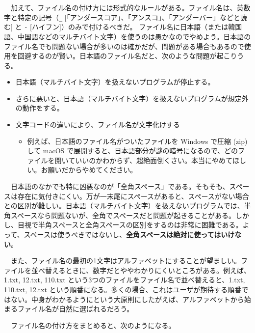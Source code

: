 \documentclass[
  a4paper,
  pandoc,
  ja=standard,
  jafont=haranoaji]{bxjsbook}
\providecommand{\tightlist}{%
  \setlength{\itemsep}{0pt}\setlength{\parskip}{0pt}}
\begin{document}
　加えて、ファイル名の付け方には形式的なルールがある。ファイル名は、英数字と特定の記号（\texttt{\_}
{[}「アンダースコア」、「アンスコ」、「アンダーバー」などと読む{]} と
\texttt{-} {[}ハイフン{]}）のみで付けるべきだ。
ファイル名に日本語（または韓国語、中国語などのマルチバイト文字）を使うのは愚かなのでやめよう。日本語のファイル名でも問題ない場合が多いのは確かだが、問題がある場合もあるので使用を回避するのが賢い。日本語のファイル名だと、次のような問題が起こりうる。

\begin{itemize}
\tightlist
\item
  日本語（マルチバイト文字）を扱えないプログラムが停止する。
\item
  さらに悪いと、日本語（マルチバイト文字）を扱えないプログラムが想定外の動作をする。
\item
  文字コードの違いにより、ファイル名が文字化けする

  \begin{itemize}
  \tightlist
  \item
    例えば、日本語のファイル名がついたファイルを Windows で圧縮 (zip)
    して macOS
    で展開すると、日本語部分が謎の暗号になるので、どのファイルを開いていいのかわからず、超絶面倒くさい。本当にやめてほしい。お願いだからやめてください。
  \end{itemize}
\end{itemize}

　日本語のなかでも特に凶悪なのが「全角スペース」である。そもそも、スペースは存在に気付きにくい。万が一末尾にスペースがあると、スペースがない場合との区別が難しい。日本語（マルチバイト文字）を扱えないプログラムでは、半角スペースなら問題ないが、全角でスペースだと問題が起きることがある。しかし、目視で半角スペースと全角スペースの区別をするのは非常に困難である。よって、スペースは使うべきではないし、\textbf{全角スペースは絶対に使ってはいけない}。

　また、ファイル名の最初の1文字はアルファベットにすることが望ましい。ファイルを並べ替えるときに、数字だとややわかりにくいところがある。例えば、1.txt,
12.txt, 110.txt という3つのファイルをファイル名で並べ替えると、1.txt,
110.txt, 12.txt
という順番になる。多くの場合、これはユーザが期待する順番ではない。中身がわかるようにという大原則にしたがえば、アルファベットから始まるファイル名が自然に選ばれるだろう。

　ファイル名の付け方をまとめると、次のようになる。
\end{document}

